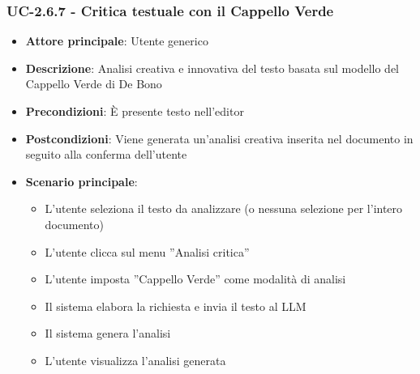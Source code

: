 \documentclass[11pt,a4paper]{article}
\begin{document}
\subsubsection{UC-2.6.7 - Critica testuale con il Cappello Verde}
\begin{itemize}
    \item \textbf{Attore principale}: Utente generico
    \item \textbf{Descrizione}: Analisi creativa e innovativa del testo basata sul modello del Cappello Verde di De Bono
    \item \textbf{Precondizioni}: È presente testo nell’editor
    \item \textbf{Postcondizioni}: Viene generata un’analisi creativa inserita nel documento in seguito alla conferma dell'utente
    \item \textbf{Scenario principale}:
    \begin{itemize}
        \item L’utente seleziona il testo da analizzare (o nessuna selezione per l'intero documento)
        \item L’utente clicca sul menu ”Analisi critica”
        \item L’utente imposta ”Cappello Verde” come modalità di analisi
        \item Il sistema elabora la richiesta e invia il testo al LLM
        \item Il sistema genera l'analisi 
        \item L'utente visualizza l'analisi generata
    \end{itemize}
\end{itemize}
\end{document}
